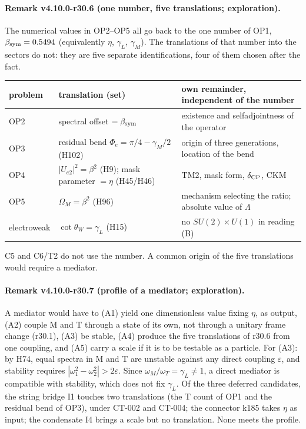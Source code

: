 \paragraph{Remark v4.10.0-r30.6 (one number, five translations; exploration).}
The numerical values in OP2--OP5 all go back to the one number of OP1, \(\beta_{\rm sym}=0.5494\) (equivalently \(\eta\), \(\gamma_L\),
\(\gamma_M\)).  The translations of that number into the sectors do not: they are five separate identifications, four of them chosen after the
fact.
\begin{center}
\small
\begin{tabular}{@{}>{\raggedright\arraybackslash}p{}>{\raggedright\arraybackslash}p{}>{\raggedright\arraybackslash}p{}@{}}
\toprule
problem & translation (set) & own remainder, independent of the number\\
\midrule
OP2 & spectral offset \(=\beta_{\rm sym}\) & existence and selfadjointness of the operator\\
OP3 & residual bend \(\Phi_e=\pi/4-\gamma_M/2\) (H102) & origin of three generations, location of the bend\\
OP4 & \(|U_{e2}|^2=\beta^2\) (H9); mask parameter \(=\eta\) (H45/H46) & TM2, mask form, \(\delta_{\rm CP}\), CKM\\
OP5 & \(\Omega_M=\beta^2\) (H96) & mechanism selecting the ratio; absolute value of \(\Lambda\)\\
electroweak & \(\cot\theta_W=\gamma_L\) (H15) & no \(SU(2)\times U(1)\) in reading (B)\\
\bottomrule
\end{tabular}
\end{center}
C5 and C6/T2 do not use the number.  A common origin of the five translations would require a mediator.

\paragraph{Remark v4.10.0-r30.7 (profile of a mediator; exploration).}
A mediator would have to (A1) yield one dimensionless value fixing \(\eta\), as output, (A2) couple M and T through a state of its own, not through a
unitary frame change (r30.1), (A3) be stable, (A4) produce the five translations of r30.6 from one coupling, and (A5) carry a scale if it is to be
testable as a particle.  For (A3): by H74, equal spectra in M and T are unstable against any direct coupling \(\varepsilon\), and stability requires
\(|\omega_1^2-\omega_2^2|>2\varepsilon\).  Since \(\omega_M/\omega_T=\gamma_L\neq1\), a direct mediator is compatible with stability, which does not
fix \(\gamma_L\).  Of the three deferred candidates, the string bridge I1 touches two translations (the T count of OP1 and the residual bend of OP3),
under CT-002 and CT-004; the connector k185 takes \(\eta\) as input; the condensate I4 brings a scale but no translation.  None meets the profile.

